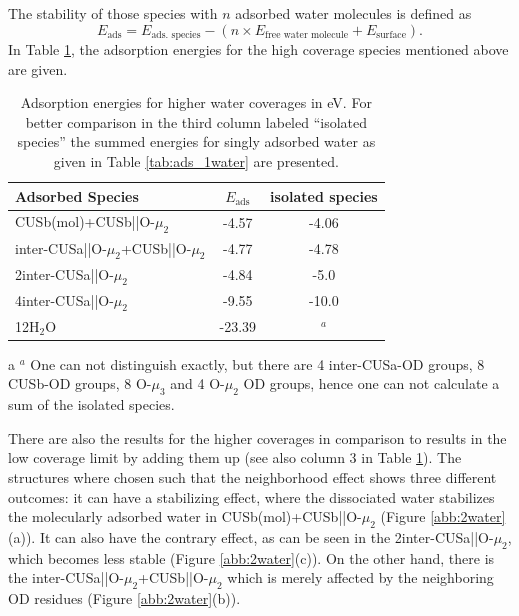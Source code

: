 \documentclass[11pt,DIV=13,BCOR=5mm,a4paper,headinclude]{scrbook}
\begin{document}
The stability of those species with $n$ adsorbed water molecules is defined as
\begin{equation}
 E_\textrm{ads}=E_\text{ads.
species}-(n\times E_\text{free water molecule}+E_\text{surface}).
\end{equation}
In Table \ref{tab:higher_water}, the adsorption energies for the high coverage species mentioned above are given.
\begin{table}[!ht]
  \centering
 \caption{Adsorption energies for higher water coverages in eV.
For better comparison in the third column labeled ``isolated species'' the summed energies for singly adsorbed water as given in Table \ref{tab:ads_1water} are presented.
\vspace*{.2cm} 
  }
  \begin{tabular}{lcc}
  \toprule
  Adsorbed Species  & $E_\text{ads}$ &isolated species \\\midrule
   CUSb(mol)+CUSb||O-$\mu_2$ & -4.57 & -4.06\\
   inter-CUSa||O-$\mu_2$+CUSb||O-$\mu_2$ & -4.77 & -4.78\\
   2inter-CUSa||O-$\mu_2$& -4.84 &-5.0 \\\hline
   4inter-CUSa||O-$\mu_2$ & -9.55 & -10.0\\\hline
   12H$_2$O & -23.39& $^a$\tnote{a} \\   \bottomrule
  \end{tabular}
  \label{tab:higher_water}
  \begin{tablenotes}\footnotesize 
    \item[a] $^a$ One can not distinguish exactly, but there are 4 inter-CUSa-OD groups, 8 CUSb-OD groups, 8 O-$\mu_3$ and 4 O-$\mu_2$ OD groups, hence one can not calculate a sum of the isolated species.
  \end{tablenotes}
\end{table}
There are also the results for the higher coverages in comparison to results in the low coverage limit by adding them up (see also column 3 in Table \ref{tab:higher_water}).
The structures where chosen such that the neighborhood effect shows three different outcomes: it can have a stabilizing effect, where the dissociated water stabilizes the molecularly adsorbed water in CUSb(mol)+CUSb||O-$\mu_2$ (Figure \ref{abb:2water}(a)).
It can also have the contrary effect, as can be seen in the  2inter-CUSa||O-$\mu_2$, which becomes less stable (Figure \ref{abb:2water}(c)).
On the other hand, there is the inter-CUSa||O-$\mu_2$+CUSb||O-$\mu_2$ which is merely affected by the neighboring OD residues (Figure \ref{abb:2water}(b)).
\end{document}
